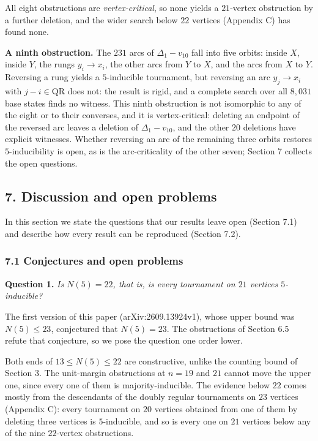 \documentclass[
]{article}
\newcounter{none} %
\begin{document}
All eight obstructions are \emph{vertex-critical}, so none yields a
\(21\)-vertex obstruction by a further deletion, and the wider search
below \(22\) vertices (Appendix C) has found none.

\textbf{A ninth obstruction.} The \(231\) arcs of \(\Delta_1 - v_{10}\)
fall into five orbits: inside \(X\), inside \(Y\), the rungs
\(y_i \to x_i\), the other arcs from \(Y\) to \(X\), and the arcs from
\(X\) to \(Y\). Reversing a rung yields a \(5\)-inducible tournament,
but reversing an arc \(y_j \to x_i\) with \(j - i \in \mathrm{QR}\) does
not: the result is rigid, and a complete search over all \(8{,}031\)
base states finds no witness. This ninth obstruction is not isomorphic
to any of the eight or to their converses, and it is vertex-critical:
deleting an endpoint of the reversed arc leaves a deletion of
\(\Delta_1 - v_{10}\), and the other \(20\) deletions have explicit
witnesses. Whether reversing an arc of the remaining three orbits
restores \(5\)-inducibility is open, as is the arc-criticality of the
other seven; Section 7 collects the open questions.

\subsection{7. Discussion and open
problems}\label{discussion-and-open-problems}

In this section we state the questions that our results leave open
(Section 7.1) and describe how every result can be reproduced (Section
7.2).

\subsubsection{7.1 Conjectures and open
problems}\label{conjectures-and-open-problems}

\textbf{Question 1.} \emph{Is \(N(5) = 22\), that is, is every
tournament on \(21\) vertices \(5\)-inducible?}

The first version of this paper (arXiv:2609.13924v1), whose upper bound
was \(N(5) \le 23\), conjectured that \(N(5) = 23\). The obstructions of
Section 6.5 refute that conjecture, so we pose the question one order
lower.

Both ends of \(13 \le N(5) \le 22\) are constructive, unlike the
counting bound of Section 3. The unit-margin obstructions at \(n = 19\)
and \(21\) cannot move the upper one, since every one of them is
majority-inducible. The evidence below \(22\) comes mostly from the
descendants of the doubly regular tournaments on \(23\) vertices
(Appendix C): every tournament on \(20\) vertices obtained from one of
them by deleting three vertices is \(5\)-inducible, and so is every one
on \(21\) vertices below any of the nine \(22\)-vertex obstructions.
\end{document}
